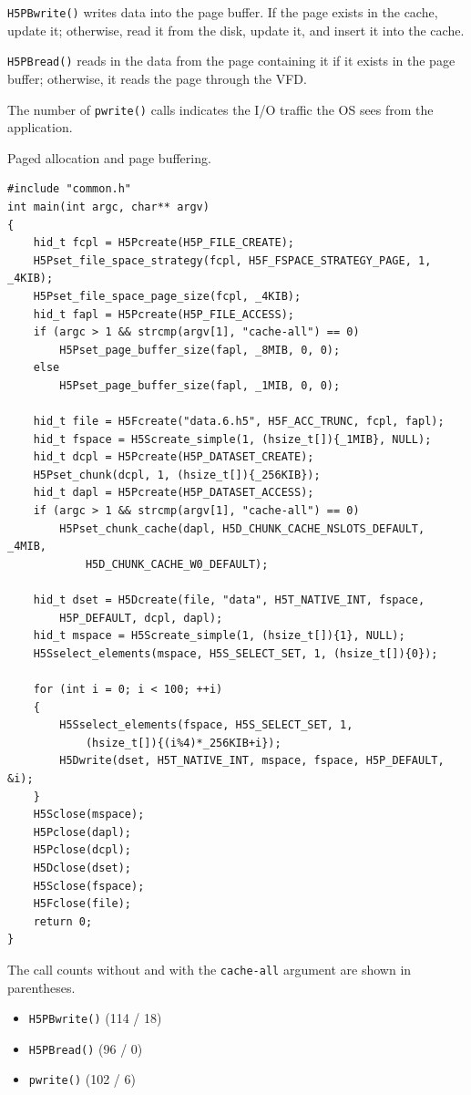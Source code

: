 \texttt{H5PBwrite()} writes data into the page buffer. If the page exists in the cache, update it; otherwise, read it from the disk, update it, and insert it into the cache.

\texttt{H5PBread()} reads in the data from the page containing it if it exists in the page buffer; otherwise, it reads the page through the VFD.

The number of \texttt{pwrite()} calls indicates the I/O traffic the OS sees from the application.

\begin{listing}
\centering
\caption{Paged allocation and page buffering.}
\label{lst:pages}
\begin{verbatim}
#include "common.h"
int main(int argc, char** argv)
{
    hid_t fcpl = H5Pcreate(H5P_FILE_CREATE);
    H5Pset_file_space_strategy(fcpl, H5F_FSPACE_STRATEGY_PAGE, 1, _4KIB);
    H5Pset_file_space_page_size(fcpl, _4KIB);
    hid_t fapl = H5Pcreate(H5P_FILE_ACCESS);
    if (argc > 1 && strcmp(argv[1], "cache-all") == 0)
        H5Pset_page_buffer_size(fapl, _8MIB, 0, 0);
    else
        H5Pset_page_buffer_size(fapl, _1MIB, 0, 0);

    hid_t file = H5Fcreate("data.6.h5", H5F_ACC_TRUNC, fcpl, fapl);
    hid_t fspace = H5Screate_simple(1, (hsize_t[]){_1MIB}, NULL);
    hid_t dcpl = H5Pcreate(H5P_DATASET_CREATE);
    H5Pset_chunk(dcpl, 1, (hsize_t[]){_256KIB});
    hid_t dapl = H5Pcreate(H5P_DATASET_ACCESS);
    if (argc > 1 && strcmp(argv[1], "cache-all") == 0)
        H5Pset_chunk_cache(dapl, H5D_CHUNK_CACHE_NSLOTS_DEFAULT, _4MIB,
            H5D_CHUNK_CACHE_W0_DEFAULT);

    hid_t dset = H5Dcreate(file, "data", H5T_NATIVE_INT, fspace,
        H5P_DEFAULT, dcpl, dapl);
    hid_t mspace = H5Screate_simple(1, (hsize_t[]){1}, NULL);
    H5Sselect_elements(mspace, H5S_SELECT_SET, 1, (hsize_t[]){0});
    
    for (int i = 0; i < 100; ++i)
    {
        H5Sselect_elements(fspace, H5S_SELECT_SET, 1,
            (hsize_t[]){(i%4)*_256KIB+i});
        H5Dwrite(dset, H5T_NATIVE_INT, mspace, fspace, H5P_DEFAULT, &i);
    }
    H5Sclose(mspace);
    H5Pclose(dapl);     
    H5Pclose(dcpl);  
    H5Dclose(dset);
    H5Sclose(fspace);
    H5Fclose(file);
    return 0;
}
\end{verbatim}
\end{listing}

The call counts without and with the \texttt{cache-all} argument are shown in parentheses.
\begin{itemize}
    \item \texttt{H5PBwrite()} (114 / 18)
    \item \texttt{H5PBread()} (96 / 0)
    \item \texttt{pwrite()} (102 / 6)
\end{itemize}

